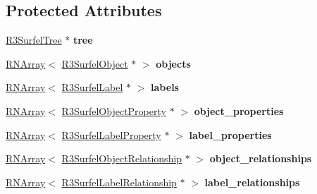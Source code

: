 \subsection*{Protected Attributes}
\begin{DoxyCompactItemize}
\item 
\hyperlink{class_r3_surfel_tree}{R3\+Surfel\+Tree} $\ast$ {\bfseries tree}\hypertarget{class_r3_surfel_scene_a12f525d6f1d75f851047f4745430c07d}{}\label{class_r3_surfel_scene_a12f525d6f1d75f851047f4745430c07d}

\item 
\hyperlink{class_r_n_array}{R\+N\+Array}$<$ \hyperlink{class_r3_surfel_object}{R3\+Surfel\+Object} $\ast$ $>$ {\bfseries objects}\hypertarget{class_r3_surfel_scene_a5ce910401977268e9a158de57b0bd7e5}{}\label{class_r3_surfel_scene_a5ce910401977268e9a158de57b0bd7e5}

\item 
\hyperlink{class_r_n_array}{R\+N\+Array}$<$ \hyperlink{class_r3_surfel_label}{R3\+Surfel\+Label} $\ast$ $>$ {\bfseries labels}\hypertarget{class_r3_surfel_scene_a441745712132cae892b754aa37f69b22}{}\label{class_r3_surfel_scene_a441745712132cae892b754aa37f69b22}

\item 
\hyperlink{class_r_n_array}{R\+N\+Array}$<$ \hyperlink{class_r3_surfel_object_property}{R3\+Surfel\+Object\+Property} $\ast$ $>$ {\bfseries object\+\_\+properties}\hypertarget{class_r3_surfel_scene_a1d1941dc05573aaa55f981df166fb58f}{}\label{class_r3_surfel_scene_a1d1941dc05573aaa55f981df166fb58f}

\item 
\hyperlink{class_r_n_array}{R\+N\+Array}$<$ \hyperlink{class_r3_surfel_label_property}{R3\+Surfel\+Label\+Property} $\ast$ $>$ {\bfseries label\+\_\+properties}\hypertarget{class_r3_surfel_scene_a6708627dad0a6dd9955ba4d06e1b29b1}{}\label{class_r3_surfel_scene_a6708627dad0a6dd9955ba4d06e1b29b1}

\item 
\hyperlink{class_r_n_array}{R\+N\+Array}$<$ \hyperlink{class_r3_surfel_object_relationship}{R3\+Surfel\+Object\+Relationship} $\ast$ $>$ {\bfseries object\+\_\+relationships}\hypertarget{class_r3_surfel_scene_ad07e74ec2b6e60481b87ba0526d267e2}{}\label{class_r3_surfel_scene_ad07e74ec2b6e60481b87ba0526d267e2}

\item 
\hyperlink{class_r_n_array}{R\+N\+Array}$<$ \hyperlink{class_r3_surfel_label_relationship}{R3\+Surfel\+Label\+Relationship} $\ast$ $>$ {\bfseries label\+\_\+relationships}\hypertarget{class_r3_surfel_scene_a447d26a73919a335f815f65084c5143b}{}\label{class_r3_surfel_scene_a447d26a73919a335f815f65084c5143b}


\end{DoxyCompactItemize}
